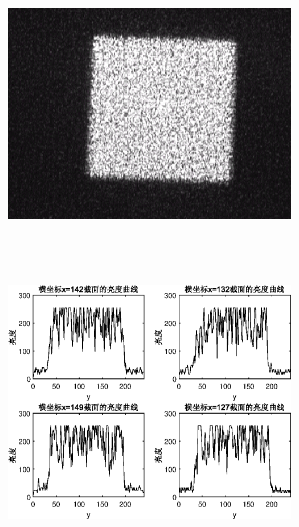 \documentclass[UTF8]{ctexart}
\makeatletter
\newcommand{\figcaption}{\def\@captype{figure}\caption}
\makeatother
\begin{document}
\begin{center}
			\includegraphics[width=7.5cm,height=7.5cm]{YUANaddDOEmoveCCD28.eps}
			\includegraphics[width=7.5cm,height=7.5cm]{addDOEmoveCCD28.eps}
			\figcaption{加DOE的CCD捕捉图和光亮度曲线(CCD与DOE距离28cm)}\label{addDOEmoveCCD28}
			

\end{center}
\end{document}
